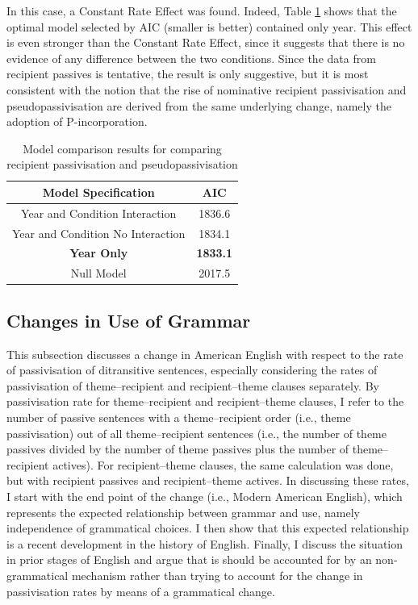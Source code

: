	In this case, a Constant Rate Effect was found. Indeed, Table \ref{tab:pas-change-tab} shows that the optimal model selected by AIC (smaller is better) contained only year. This effect is even stronger than the Constant Rate Effect, since it suggests that there is no evidence of any difference between the two conditions. Since the data from recipient passives is tentative, the result is only suggestive, but it is most consistent with the notion that the rise of nominative recipient passivisation and pseudopassivisation are derived from the same underlying change, namely the adoption of P-incorporation.

	\begin{table}[h!]
		\begin{tabular}{cc}
		Model Specification & AIC\\
		\hline
		Year and Condition Interaction & 1836.6 \\
		Year and Condition No Interaction & 1834.1 \\
		\textbf{Year Only} & \textbf{1833.1} \\
		Null Model & 2017.5 \\
		\end{tabular}
		\caption{\label{tab:pas-change-tab}Model comparison results for comparing recipient passivisation and pseudopassivisation}
	\end{table}

	\subsection{Changes in Use of Grammar}

	This subsection discusses a change in American English with respect to the rate of passivisation of ditransitive sentences, especially considering the rates of passivisation of theme--recipient and recipient--theme clauses separately. By passivisation rate for theme--recipient and recipient--theme clauses, I refer to the number of passive sentences with a theme--recipient order (i.e., theme passivisation) out of all theme--recipient sentences (i.e., the number of theme passives divided by the number of theme passives plus the number of theme--recipient actives). For recipient--theme clauses, the same calculation was done, but with recipient passives and recipient--theme actives. In discussing these rates, I start with the end point of the change (i.e., Modern American English), which represents the expected relationship between grammar and use, namely independence of grammatical choices. I then show that this expected relationship is a recent development in the history of English. Finally, I discuss the situation in prior stages of English and argue that is should be accounted for by an non-grammatical mechanism rather than trying to account for the change in passivisation rates by means of a grammatical change.

